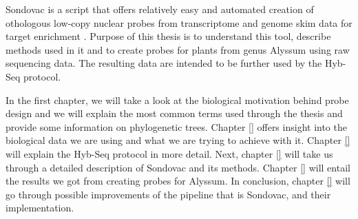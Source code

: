 Sondovac is a script that offers relatively easy and automated creation of othologous low-copy nuclear probes from 
transcriptome and genome skim data for target enrichment \cite{sondovac}. Purpose of this thesis is to understand 
this tool, describe methods used in it and to create probes for plants from genus Alyssum using raw sequencing data. 
The resulting data are intended to be further used by the Hyb-Seq protocol. 

In the first chapter, we will take a look at the biological motivation behind probe design and we will explain the most 
common terms used through the thesis and provide some information on phylogenetic trees. Chapter \ref{} offers insight 
into the biological data we are using and what we are trying to achieve with it. Chapter \ref{} will explain the Hyb-Seq 
protocol in more detail. Next, chapter \ref{} will take us through a detailed description of Sondovac and its methods. 
Chapter \ref{} will entail the results we got from creating probes for Alyssum. In conclusion, chapter \ref{} will go 
through possible improvements of the pipeline that is Sondovac, and their implementation. 


